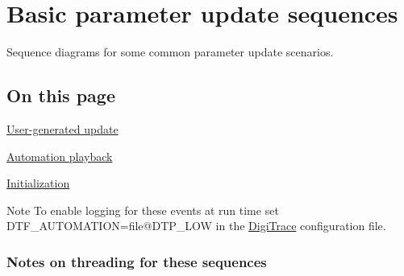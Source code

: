 \hypertarget{a00353}{}\section{Basic parameter update sequences}
\label{a00353}
Sequence diagrams for some common parameter update scenarios. 

\hypertarget{a00353_advancedTopics_parameterUpdates_sequences_contents}{}\subsection{On this page}\label{a00353_advancedTopics_parameterUpdates_sequences_contents}
\begin{DoxyItemize}
\item \hyperlink{a00353_parameterUpdates_sequences_user}{User-\/generated update} \item \hyperlink{a00353_parameterUpdates_sequences_automation}{Automation playback} \item \hyperlink{a00353_parameterUpdates_sequences_initialization}{Initialization}\end{DoxyItemize}
\begin{DoxyNote}{Note}
To enable logging for these events at run time set {\ttfamily D\+T\+F\+\_\+\+A\+U\+T\+O\+M\+A\+T\+I\+O\+N=file@D\+T\+P\+\_\+\+L\+O\+W} in the \hyperlink{a00364}{Digi\+Trace} configuration file.
\end{DoxyNote}
\hypertarget{a00353_advancedTopics_parameterUpdates_sequences_notes}{}\subsubsection{Notes on threading for these sequences}\label{a00353_advancedTopics_parameterUpdates_sequences_notes}

